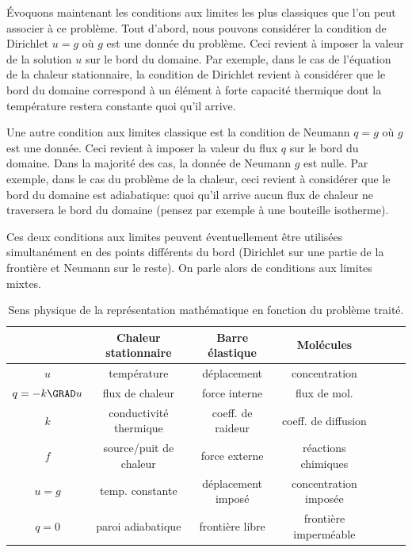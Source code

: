 \documentclass[12pt,a4paper,twoside]{article}
\begin{document}
\'Evoquons maintenant les conditions aux limites les plus classiques
que l'on peut associer \`a ce probl\`eme.
Tout d'abord, nous pouvons consid\'erer la condition de Dirichlet
$u = g$ o\`u $g$ est une donn\'ee du probl\`eme. Ceci revient \`a imposer
la valeur de la solution $u$ sur le bord du domaine.
Par exemple, dans le cas de l'\'equation de la chaleur stationnaire,
la condition de Dirichlet revient \`a consid\'erer que le bord du domaine
correspond \`a un \'el\'ement \`a forte capacit\'e thermique
dont la temp\'erature restera constante quoi qu'il arrive.


Une autre condition aux limites classique est la condition de Neumann
$q = g$ o\`u $g$ est une donn\'ee. Ceci revient \`a imposer la valeur
du flux $q$ sur le bord du domaine.
Dans la majorit\'e des cas, la donn\'ee de Neumann $g$ est nulle.
Par exemple, dans le cas du probl\`eme de la chaleur, ceci revient
\`a consid\'erer que le bord du domaine est adiabatique:
quoi qu'il arrive aucun flux de chaleur ne traversera le bord du domaine
(pensez par exemple \`a une bouteille isotherme).


Ces deux conditions aux limites peuvent \'eventuellement \^etre utilis\'ees 
simultan\'ement en des points diff\'erents du bord
(Dirichlet sur une partie de la fronti\`ere et Neumann sur le reste).
On parle alors de conditions aux limites mixtes.

\begin{table}[h]
  \centering
  \begin{tabular}{|c|c|c|c|c|c|c|}
    \hline
    &Chaleur stationnaire&Barre \'elastique& Mol\'ecules
    \\
    \hline
    $u$ & temp\'erature & d\'eplacement & concentration
    \\
    \hline
    $q=-k\GRAD u$ & flux de chaleur & force interne & flux de mol.
    \\
    \hline
    $k$ & conductivit\'e thermique & coeff. de raideur & coeff. de diffusion
    \\
    \hline
    $f$& source/puit de chaleur & force externe & r\'eactions chimiques
    \\
    \hline
    $u=g$ & temp. constante & d\'eplacement impos\'e & concentration impos\'ee
    \\
    \hline
    $q=0$ & paroi adiabatique & fronti\`ere libre & fronti\`ere imperm\'eable
    \\
    \hline
  \end{tabular}
  \caption{Sens physique de la repr\'esentation math\'ematique en fonction
    du probl\`eme trait\'e.}
  \label{tab:pb_ell}
\end{table}
\end{document}
